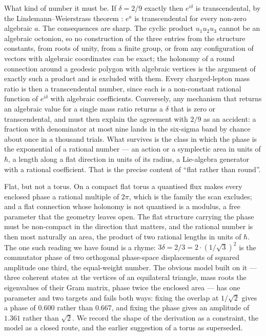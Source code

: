 What kind of number it must be. If $\delta = 2/9$ exactly then $e^{i\delta}$ is transcendental,
by the Lindemann--Weierstrass theorem \autocite[ch.~1]{bakerTranscendentalNumberTheory1975}: $e^{a}$ is
transcendental for every non-zero algebraic $a$. The consequences are sharp. The cyclic product
$u_1u_2u_3$ cannot be an algebraic octonion, so no construction of the three entries from the
structure constants, from roots of unity, from a finite group, or from any configuration of
vectors with algebraic coordinates can be exact; the holonomy of a round connection around a
geodesic polygon with algebraic vertices is the argument of exactly such a product and is
excluded with them. Every charged-lepton mass ratio is then a transcendental number, since each
is a non-constant rational function of $e^{i\delta}$ with algebraic coefficients. Conversely,
any mechanism that returns an algebraic value for a single mass ratio returns a $\delta$ that is
zero or transcendental, and must then explain the agreement with $2/9$ as an accident: a
fraction with denominator at most nine lands in the six-sigma band by chance about once in a
thousand trials. What survives is the class in which the phase is the exponential of a rational
number --- an action or a symplectic area in units of $\hbar$, a length along a flat direction
in units of its radius, a Lie-algebra generator with a rational coefficient. That is the precise
content of ``flat rather than round''.

Flat, but not a torus. On a compact flat torus a quantised flux makes every enclosed phase a
rational multiple of $2\pi$, which is the family the scan excludes; and a flat connection whose
holonomy is not quantised is a modulus, a free parameter that the geometry leaves open. The flat
structure carrying the phase must be non-compact in the direction that matters, and the rational
number is then most naturally an area, the product of two rational lengths in units of $\hbar$.
The one such reading we have found is a rhyme: $3\delta = 2/3 = 2\cdot(1/\sqrt3)^2$ is the
commutator phase of two orthogonal phase-space displacements of squared amplitude one third, the
equal-weight number. The obvious model built on it --- three coherent states at the vertices of
an equilateral triangle, mass roots the eigenvalues of their Gram matrix, phase twice the
enclosed area --- has one parameter and two targets and fails both ways: fixing the overlap at
$1/\sqrt2$ gives a phase of $0.600$ rather than $0.667$, and fixing the phase gives an amplitude
of $1.361$ rather than $\sqrt2$. We record the shape of the derivation as a constraint, the
model as a closed route, and the earlier suggestion of a torus as superseded.

